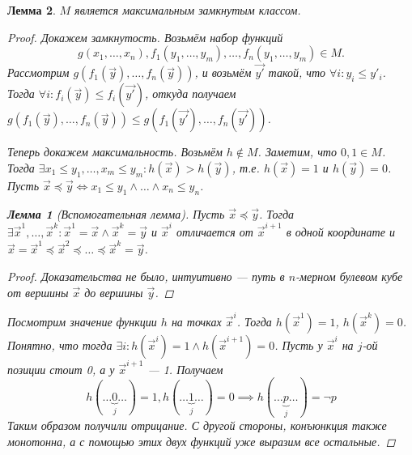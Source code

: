 \documentclass[12pt]{article}
\let\la\land
\let\n\neg
\let\nin\notin
\theoremstyle{definition}
\theoremstyle{plain}
\newtheorem{lemma}{Лемма}[section]
\theoremstyle{remark}
\begin{document}
\begin{lemma}
  $M$ является максимальным замкнутым классом.

  \begin{proof}
    Докажем замкнутость. Возьмём набор функций
    \begin{displaymath}
      g(x_1, \dots, x_n), f_1(y_1, \dots, y_m), \dots, f_n(y_1,
      \dots, y_m) \in M.
    \end{displaymath}
    Рассмотрим $g(f_1(\vec{y}), \dots, f_n(\vec{y}))$, и возьмём
    $\vec{y'}$ такой, что $\forall i \colon y_i \leqslant y'_i$.
    Тогда $\forall i \colon f_i(\vec{y}) \leqslant f_i(\vec{y'})$,
    откуда получаем $g(f_1(\vec{y}), \dots, f_n(\vec{y})) \leqslant
    g(f_1(\vec{y'}), \dots, f_n(\vec{y'}))$.

    Теперь докажем максимальность. Возьмём $h \nin M$. Заметим, что
    $0, 1 \in M$. Тогда $\exists x_1 \leqslant y_1, \dots, x_m
    \leqslant y_m \colon h(\vec{x}) > h(\vec{y})$, т.е. $h(\vec{x}) =
    1$ и $h(\vec{y}) = 0$. Пусть $\vec{x} \preccurlyeq
    \vec{y} \iff x_1 \leqslant y_1 \la \dots \la x_n \leqslant y_n$.

    \begin{lemma}[Вспомогательная лемма]
      Пусть $\vec{x} \preccurlyeq \vec{y}$. Тогда $\exists \vec{x}^1,
      \dots, \vec{x}^k \colon \vec{x}^1 = \vec{x} \la \vec{x}^k =
      \vec{y}$ и $\vec{x}^i$ отличается от $\vec{x}^{i+1}$ в одной
      координате и $\vec{x} = \vec{x}^1 \preccurlyeq \vec{x}^2
      \preccurlyeq \dots \preccurlyeq \vec{x}^k = \vec{y}$.
      \begin{proof}
        Доказательства не было, интуитивно --- путь в $n$-мерном
        булевом кубе от вершины $\vec{x}$ до вершины $\vec{y}$.
      \end{proof}
    \end{lemma}
    Посмотрим значение функции $h$ на точках $\vec{x}^i$. Тогда
    $h(\vec{x}^1) = 1$, $h(\vec{x}^k) = 0$. Понятно, что тогда
    $\exists i \colon h(\vec{x}^i) = 1 \la h(\vec{x}^{i+1}) = 0$.
    Пусть у $\vec{x}^i$ на $j$-ой позиции стоит 0, а у
    $\vec{x}^{i+1}$ --- 1. Получаем
    \[
      h(\dots \underbrace{0}_j \dots) = 1, h(\dots \underbrace{1}_j
      \dots) = 0 \implies h(\dots \underbrace{p}_j \dots) = \n p
    \]
    Таким образом получили отрицание. С другой стороны, конъюнкция
    также монотонна, а с помощью этих двух функций уже выразим все остальные.
  \end{proof}
\end{lemma}
\end{document}
